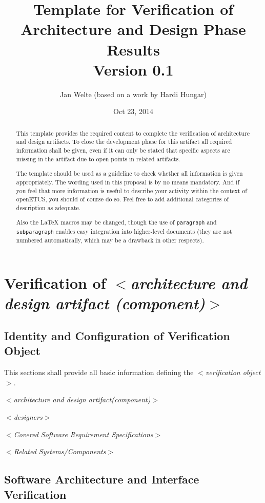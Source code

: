 \documentclass{article}
\title{Template for Verification of Architecture and Design Phase Results\\Version 0.1}
\author{Jan Welte (based on a work by Hardi Hungar)}
\date{Oct 23, 2014}
\newcommand{\tbi}[1]{$<$\textit{#1}$>$}
\begin{document}
\maketitle

\begin{abstract}
This template provides the required content to complete the verification of architecture and design artifacts.
To close the development phase for this artifact all required information shall be given, even if it can only be stated that specific aspects are missing in the artifact due to open points in related artifacts. 

The template should be used as a guideline to check whether all
information is given appropriately. The wording used in this proposal
is by no means mandatory. And if you feel that more information is
useful to describe your activity within the context of openETCS, you
should of course do so. Feel free to add additional categories of
description as adequate. 

Also the \LaTeX{} macros may be changed, though the use of
\texttt{paragraph} and \texttt{subparagraph} enables easy integration
into higher-level documents (they are not numbered automatically,
which may be a drawback in other respects). 
\end{abstract}

\section{Verification of \tbi{architecture and design artifact (component)}}

\subsection{Identity and Configuration of Verification Object}

This sections shall provide all basic information defining the \tbi{verification object}.

\tbi{architecture and design artifact(component)}

\tbi{designers}

\tbi{Covered Software Requirement Specifications}

\tbi{Related Systems/Components}


\subsection{Software Architecture and Interface Verification}
\end{document}
